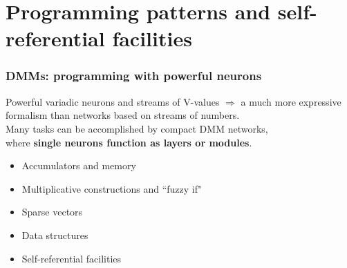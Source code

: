 \documentclass{beamer}
\newcommand{\msmagenta}[1]{{\color{mymagenta} #1}}
\begin{document}
\section{Programming patterns and self-referential facilities}




\begin{frame}

  \frametitle{\msmagenta{DMMs: programming with powerful neurons}}

Powerful variadic neurons and streams of V-values $\Rightarrow$ a much more expressive formalism
 than networks based on streams of numbers.\\[2ex]

Many tasks can be accomplished by \msmagenta{compact DMM networks},\\
 where {\bf single neurons function as layers or modules}.

\hrulefill

\begin{itemize}

\item Accumulators and memory

\item Multiplicative constructions and ``fuzzy if"

\item Sparse vectors

\item Data structures

\item Self-referential facilities

\end{itemize}






\end{frame}
\end{document}
